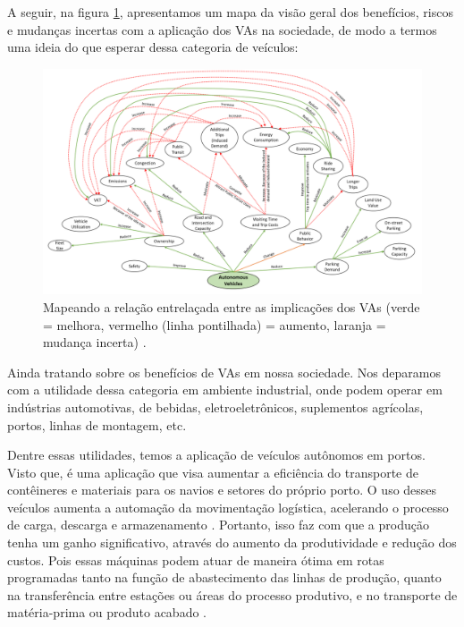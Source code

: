 A seguir, na figura \ref{mapa_resumo}, apresentamos um mapa da visão geral dos benefícios, riscos e mudanças incertas com a aplicação dos VAs na sociedade, de modo a termos uma ideia do que esperar dessa categoria de veículos:
\begin{figure}[H]
\centering
\includegraphics[width=16cm]{Figures/map.png}
\caption{Mapeando a relação entrelaçada entre as implicações dos VAs (verde = melhora, vermelho (linha pontilhada) = aumento, laranja = mudança incerta) \cite{mundobrasil}.}
\label{mapa_resumo}
\end{figure}


 \label{industria}

Ainda tratando sobre os benefícios de VAs em nossa sociedade. Nos deparamos com a utilidade dessa categoria em ambiente industrial, onde podem operar em indústrias automotivas, de bebidas, eletroeletrônicos, suplementos agrícolas, portos, linhas de montagem, etc.

Dentre essas utilidades, temos a aplicação de veículos autônomos em portos. Visto que, é uma aplicação que visa aumentar a eficiência do transporte de contêineres e materiais para os navios e setores do próprio porto. O uso desses veículos aumenta a automação da movimentação logística, acelerando o processo de carga, descarga e armazenamento \cite{aplicacao, aplicacao2}.
Portanto, isso faz com que a produção tenha um ganho significativo, através do aumento da produtividade e redução dos custos. Pois essas máquinas podem atuar de maneira ótima em rotas programadas tanto na função de abastecimento das linhas de produção, quanto na transferência entre estações ou áreas do processo produtivo, e no transporte de matéria-prima ou produto acabado \cite{aplicacao}.

